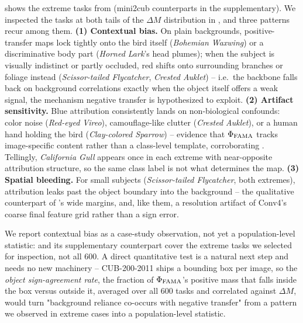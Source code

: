  shows the extreme tasks from  (mini2cub counterparts in the supplementary). We inspected the tasks at both tails of the $\Delta M$ distribution in , and three patterns recur among them. \textbf{(1) Contextual bias.} On plain backgrounds, positive-transfer maps lock tightly onto the bird itself (\emph{Bohemian Waxwing}) or a discriminative body part (\emph{Horned Lark}'s head plumes); when the subject is visually indistinct or partly occluded, red shifts onto surrounding branches or foliage instead (\emph{Scissor-tailed Flycatcher}, \emph{Crested Auklet}) -- i.e.\ the backbone falls back on background correlations exactly when the object itself offers a weak signal, the mechanism negative transfer is hypothesized to exploit. \textbf{(2) Artifact sensitivity.} Blue attribution consistently lands on non-biological confounds: color noise (\emph{Red-eyed Vireo}), camouflage-like clutter (\emph{Crested Auklet}), or a human hand holding the bird (\emph{Clay-colored Sparrow}) -- evidence that $\Phi_{\mathrm{FAMA}}$ tracks image-specific content rather than a class-level template, corroborating . Tellingly, \emph{California Gull} appears once in each extreme with near-opposite attribution structure, so the same class label is not what determines the map. \textbf{(3) Spatial bleeding.} For small subjects (\emph{Scissor-tailed Flycatcher}, both extremes), attribution leaks past the object boundary into the background -- the qualitative counterpart of 's wide \biadt margins, and, like them, a resolution artifact of Conv4's coarse final feature grid rather than a sign error.

We report contextual bias as a case-study observation, not yet a population-level statistic:  and its supplementary counterpart cover the extreme tasks we selected for inspection, not all 600. A direct quantitative test is a natural next step and needs no new machinery -- CUB-200-2011 ships a bounding box per image, so the \emph{object sign-agreement rate}, the fraction of $\Phi_{\mathrm{FAMA}}$'s positive mass that falls inside the box versus outside it, averaged over all 600 tasks and correlated against $\Delta M$, would turn "background reliance co-occurs with negative transfer" from a pattern we observed in extreme cases into a population-level statistic.

